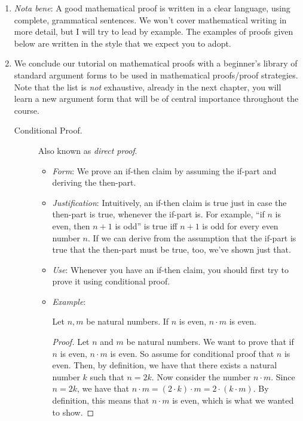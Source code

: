 \begin{enumerate}[{\thesection}.1]
	\item \emph{Nota bene}: A good mathematical proof is written in a clear language, using complete, grammatical sentences. We won't cover mathematical writing in more detail, but I will try to lead by example. The examples of proofs given below are written in the style that we expect you to adopt. 
	 	 
	 \item We conclude our tutorial on mathematical proofs with a beginner's library of standard argument forms to be used in mathematical proofs/proof strategies. Note that the list is \emph{not} exhaustive, already in the next chapter, you will learn a new argument form that will be of central importance throughout the course.
		
		\begin{description}
				
			\item[Conditional Proof.] Also known as \emph{direct proof}.
						
			\begin{itemize}
			
				\item \emph{Form}: We prove an if-then claim by assuming the if-part and deriving the then-part.
			
				\item \emph{Justification}: Intuitively, an if-then claim is true just in case the then-part is true, whenever the if-part is. For example, ``if $n$ is even, then $n+1$ is odd'' is true iff $n+1$ is odd for every even number $n$. If we can derive from the assumption that the if-part is true that the then-part must be true, too, we've shown just that.
				
				\item \emph{Use}: Whenever you have an if-then claim, you should first try to prove it using conditional proof.
			
			\item \emph{Example}:
				
				\vspace{1ex}
				
					\begin{proposition}
			Let $n,m$ be natural numbers. If $n$ is even, $n\cdot m$ is even.
			\end{proposition}
			
			\begin{proof}
			Let $n$ and $m$ be natural numbers. We want to prove that if $n$ is even, $n\cdot m$ is even. So assume for conditional proof that $n$ is even. Then, by definition, we have that there exists a natural number $k$ such that $n=2k$. Now consider the number $n\cdot m$. Since $n=2k$, we have that $n \cdot m=(2\cdot k)\cdot m=2\cdot (k\cdot m)$. By definition, this means that $n\cdot m$ is even, which is what we wanted to show. 
			\end{proof}
			

\end{itemize}
\end{description}
\end{enumerate}
